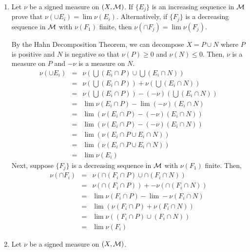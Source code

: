 \begin{enumerate}
\item	Let $\nu$ be a signed measure on $(X, {\mathcal M})$. If $\{E_j\}$ is an increasing sequence in ${\mathcal M}$ prove that $\nu(\cup E_i)=\lim \nu (E_i)$. Alternatively, if $\{F_j\}$ is a decreasing sequence in ${\mathcal M}$ with $\nu(F_1)$ finite, then $\nu(\cap F_j)= \lim \nu(F_j)$.
\begin{pf}
By the Hahn Decomposition Theorem, we can decompose $X=P \cup N$ where $P$ is positive and $N$ is negative so that $\nu(P)\geq 0$ and $\nu(N)\leq 0$. Then, $\nu$ is a measure on $P$ and $-\nu$ is a measure on $N$.\begin{eqnarray*}
\nu(\cup E_i) &= &\nu\left(\bigcup(E_i \cap P)\cup \bigcup (E_i \cap N)\right)	\\
&=& \nu\left(\bigcup(E_i \cap P)\right) + \nu \left( \bigcup (E_i \cap N)\right)	\\
&=& \nu\left(\bigcup(E_i \cap P)\right) - (-\nu) \left( \bigcup (E_i \cap N)\right)	\\
&=& \lim \nu\left(E_i \cap P\right) -\lim (-\nu) \left(E_i \cap N\right)	\\
&=& \lim \left( \nu\left(E_i \cap P\right) -(-\nu) \left(E_i \cap N\right)	\right) \\
&=& \lim \left( \nu\left(E_i \cap P\right) -(-\nu) \left(E_i \cap N\right)	\right) \\
&=& \lim \left( \nu\left(E_i \cap P \cup E_i \cap N\right)	\right) \\
&=& \lim \left( \nu\left(E_i \cap P \cup E_i \cap N\right)	\right) \\
&=& \lim  \nu\left(E_i \right) 
\end{eqnarray*}
Next, suppose $\{F_j\}$ is a decreasing sequence in ${\mathcal M}$ with $\nu(F_1)$ finite. Then, 
\begin{eqnarray*}
\nu(\cap F_i) &=& \nu(\cap(F_i \cap P) \cup \cap (F_i \cap N))	\\
 &=& \nu(\cap(F_i \cap P))+ -\nu( \cap (F_i \cap N))	\\
  &=& \lim \nu(F_i \cap P)- \lim -\nu( F_i \cap N)	\\
  &=& \lim \left( \nu(F_i \cap P) + \nu( F_i \cap N)	\right) \\
  &=& \lim  \nu \left((F_i \cap P) \cup ( F_i \cap N)	\right) \\
   &=& \lim  \nu \left(F_i\right) 
\end{eqnarray*}
\end{pf}
\item Let $\nu$ be a signed measure on $(X, {\mathcal M})$.\\

\end{enumerate}
